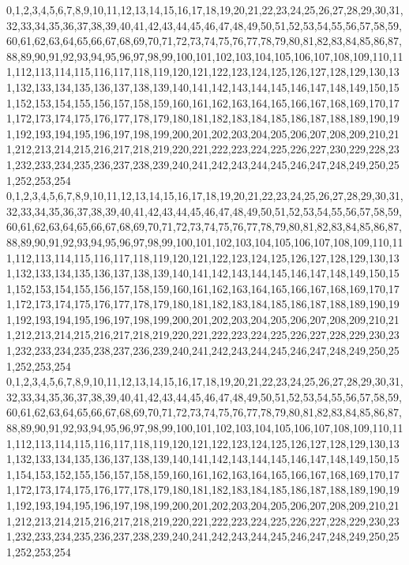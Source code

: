 \documentclass[12pt]{article}
\begin{document}
{0,1,2,3,4,5,6,7,8,9,10,11,12,13,14,15,16,17,18,19,20,21,22,23,24,25,26,27,28,29,30,31,32,33,34,35,36,37,38,39,40,41,42,43,44,45,46,47,48,49,50,51,52,53,54,55,56,57,58,59,60,61,62,63,64,65,66,67,68,69,70,71,72,73,74,75,76,77,78,79,80,81,82,83,84,85,86,87,88,89,90,91,92,93,94,95,96,97,98,99,100,101,102,103,104,105,106,107,108,109,110,111,112,113,114,115,116,117,118,119,120,121,122,123,124,125,126,127,128,129,130,131,132,133,134,135,136,137,138,139,140,141,142,143,144,145,146,147,148,149,150,151,152,153,154,155,156,157,158,159,160,161,162,163,164,165,166,167,168,169,170,171,172,173,174,175,176,177,178,179,180,181,182,183,184,185,186,187,188,189,190,191,192,193,194,195,196,197,198,199,200,201,202,203,204,205,206,207,208,209,210,211,212,213,214,215,216,217,218,219,220,221,222,223,224,225,226,227,230,229,228,231,232,233,234,235,236,237,238,239,240,241,242,243,244,245,246,247,248,249,250,251,252,253,254\\
0,1,2,3,4,5,6,7,8,9,10,11,12,13,14,15,16,17,18,19,20,21,22,23,24,25,26,27,28,29,30,31,32,33,34,35,36,37,38,39,40,41,42,43,44,45,46,47,48,49,50,51,52,53,54,55,56,57,58,59,60,61,62,63,64,65,66,67,68,69,70,71,72,73,74,75,76,77,78,79,80,81,82,83,84,85,86,87,88,89,90,91,92,93,94,95,96,97,98,99,100,101,102,103,104,105,106,107,108,109,110,111,112,113,114,115,116,117,118,119,120,121,122,123,124,125,126,127,128,129,130,131,132,133,134,135,136,137,138,139,140,141,142,143,144,145,146,147,148,149,150,151,152,153,154,155,156,157,158,159,160,161,162,163,164,165,166,167,168,169,170,171,172,173,174,175,176,177,178,179,180,181,182,183,184,185,186,187,188,189,190,191,192,193,194,195,196,197,198,199,200,201,202,203,204,205,206,207,208,209,210,211,212,213,214,215,216,217,218,219,220,221,222,223,224,225,226,227,228,229,230,231,232,233,234,235,238,237,236,239,240,241,242,243,244,245,246,247,248,249,250,251,252,253,254\\
0,1,2,3,4,5,6,7,8,9,10,11,12,13,14,15,16,17,18,19,20,21,22,23,24,25,26,27,28,29,30,31,32,33,34,35,36,37,38,39,40,41,42,43,44,45,46,47,48,49,50,51,52,53,54,55,56,57,58,59,60,61,62,63,64,65,66,67,68,69,70,71,72,73,74,75,76,77,78,79,80,81,82,83,84,85,86,87,88,89,90,91,92,93,94,95,96,97,98,99,100,101,102,103,104,105,106,107,108,109,110,111,112,113,114,115,116,117,118,119,120,121,122,123,124,125,126,127,128,129,130,131,132,133,134,135,136,137,138,139,140,141,142,143,144,145,146,147,148,149,150,151,154,153,152,155,156,157,158,159,160,161,162,163,164,165,166,167,168,169,170,171,172,173,174,175,176,177,178,179,180,181,182,183,184,185,186,187,188,189,190,191,192,193,194,195,196,197,198,199,200,201,202,203,204,205,206,207,208,209,210,211,212,213,214,215,216,217,218,219,220,221,222,223,224,225,226,227,228,229,230,231,232,233,234,235,236,237,238,239,240,241,242,243,244,245,246,247,248,249,250,251,252,253,254\\
}
\end{document}
